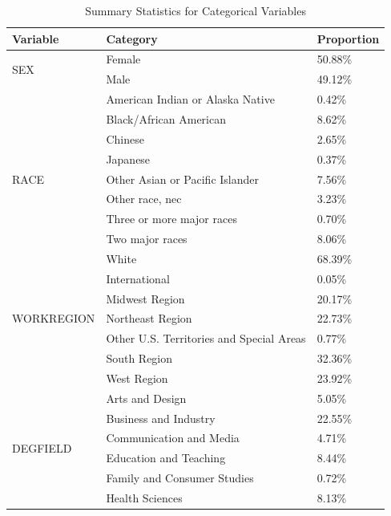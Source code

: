 \documentclass{article}
\newenvironment{custommargins}[2]{%
    \newgeometry{left=#1, right=#2}%
}{%
    \restoregeometry%
}
\begin{document}
\begin{custommargins}{2cm}{2cm}
    \begin{table}[ht]
    \centering
    \caption{Summary Statistics for Categorical Variables}
    \begin{tabular}{@{}lll@{}}
    \toprule
    Variable & Category & Proportion \\ 
    \midrule
    \multirow{2}{*}{SEX} & Female & 50.88\% \\
                         & Male & 49.12\% \\
    \midrule
    \multirow{9}{*}{RACE} & American Indian or Alaska Native & 0.42\% \\
                          & Black/African American & 8.62\% \\
                          & Chinese & 2.65\% \\
                          & Japanese & 0.37\% \\
                          & Other Asian or Pacific Islander & 7.56\% \\
                          & Other race, nec & 3.23\% \\
                          & Three or more major races & 0.70\% \\
                          & Two major races & 8.06\% \\
                          & White & 68.39\% \\
    \midrule
    \multirow{5}{*}{WORKREGION} & International & 0.05\% \\
                                & Midwest Region & 20.17\% \\
                                & Northeast Region & 22.73\% \\
                                & Other U.S. Territories and Special Areas & 0.77\% \\
                                & South Region & 32.36\% \\
                                & West Region & 23.92\% \\
    \midrule
    \multirow{13}{*}{DEGFIELD} & Arts and Design & 5.05\% \\
                               & Business and Industry & 22.55\% \\
                               & Communication and Media & 4.71\% \\
                               & Education and Teaching & 8.44\% \\
                               & Family and Consumer Studies & 0.72\% \\
                               & Health Sciences & 8.13\% \\

\end{tabular}
\end{table}
\end{custommargins}
\end{document}
